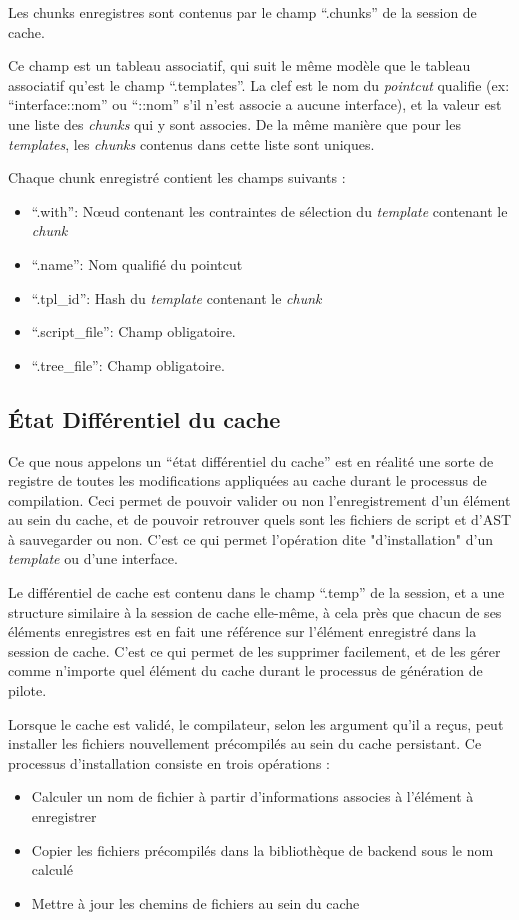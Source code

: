 \documentclass[french]{rtxreport}
\begin{document}
Les chunks enregistres sont contenus par le champ ``.chunks'' de la session de
cache.

Ce champ est un tableau associatif, qui suit le même modèle que le tableau
associatif qu'est le champ ``.templates''. La clef est le nom du
\emph{pointcut} qualifie (ex: ``interface::nom'' ou ``::nom'' s'il n'est
associe a aucune interface), et la valeur est une liste des \emph{chunks} qui y
sont associes. De la même manière que pour les \emph{templates}, les
\emph{chunks} contenus dans cette liste sont uniques.

Chaque chunk enregistré contient les champs suivants :
\begin{itemize}
    \item ``.with'': Nœud contenant les contraintes de sélection du
        \emph{template} contenant le \emph{chunk}
    \item ``.name'': Nom qualifié du pointcut
    \item ``.tpl\_id'': Hash du \emph{template} contenant le \emph{chunk}
    \item ``.script\_file'': Champ obligatoire.
    \item ``.tree\_file'': Champ obligatoire.
\end{itemize}


\subsection{État Différentiel du cache}

Ce que nous appelons un ``état différentiel du cache'' est en réalité une sorte
de registre de toutes les modifications appliquées au cache durant le processus
de compilation. Ceci permet de pouvoir valider ou non l'enregistrement d'un
élément au sein du cache, et de pouvoir retrouver quels sont les fichiers de
script et d'AST à sauvegarder ou non. C'est ce qui permet l'opération dite
"d'installation" d'un \emph{template} ou d'une interface.

Le différentiel de cache est contenu dans le champ ``.temp'' de la session, et
a une structure similaire à la session de cache elle-même, à cela près que chacun
de ses éléments enregistres est en fait une référence sur l'élément
enregistré dans la session de cache. C'est ce qui permet de les supprimer
facilement, et de les gérer comme n'importe quel élément du cache durant le
processus de génération de pilote.

Lorsque le cache est validé, le compilateur, selon les argument qu'il a reçus,
peut installer les fichiers nouvellement précompilés au sein du cache
persistant. Ce processus d'installation consiste en trois opérations :
\begin{itemize}
    \item Calculer un nom de fichier à partir d'informations associes à
        l'élément à enregistrer
    \item Copier les fichiers précompilés dans la bibliothèque de backend sous
        le nom calculé
    \item Mettre à jour les chemins de fichiers au sein du cache
\end{itemize}
\end{document}
